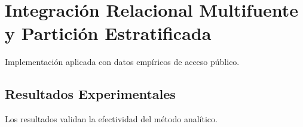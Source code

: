 \section{Integración Relacional Multifuente y Partición Estratificada}
Implementación aplicada con datos empíricos de acceso público.
\subsection{Resultados Experimentales}
Los resultados validan la efectividad del método analítico.
